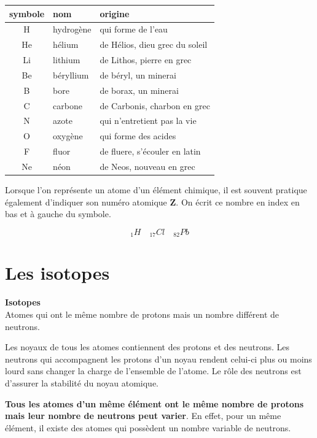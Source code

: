 \documentclass[
  11pt,
  a4paper,
  openany]{book}
\begin{document}
\begin{longtable}[]{@{}cll@{}}
\toprule()
symbole & nom & origine \\
\midrule()
\endhead
H & hydrogène & qui forme de l'eau \\
He & hélium & de Hélios, dieu grec du soleil \\
Li & lithium & de Lithos, pierre en grec \\
Be & béryllium & de béryl, un minerai \\
B & bore & de borax, un minerai \\
C & carbone & de Carbonis, charbon en grec \\
N & azote & qui n'entretient pas la vie \\
O & oxygène & qui forme des acides \\
F & fluor & de fluere, s'écouler en latin \\
Ne & néon & de Neos, nouveau en grec \\
\bottomrule()
\end{longtable}

Lorsque l'on représente un atome d'un élément chimique, il est souvent pratique également d'indiquer son numéro atomique \textbf{Z}. On écrit ce nombre en index en bas et à gauche du symbole.

\[ _{1}H \quad _{17}Cl \quad _{82}Pb \]

\newpage

\hypertarget{les-isotopes}{%
\section{Les isotopes}\label{les-isotopes}}

\begin{tcolorbox}
\textbf{Isotopes}\\
Atomes qui ont le même nombre de protons mais un nombre différent de neutrons.

\end{tcolorbox}

Les noyaux de tous les atomes contiennent des protons et des neutrons. Les neutrons qui accompagnent les protons d'un noyau rendent celui-ci plus ou moins lourd sans changer la charge de l'ensemble de l'atome. Le rôle des neutrons est d'assurer la stabilité du noyau atomique.

\textbf{Tous les atomes d'un même élément ont le même nombre de protons mais leur nombre de neutrons peut varier}. En effet, pour un même élément, il existe des atomes qui possèdent un nombre variable de neutrons.
\end{document}
